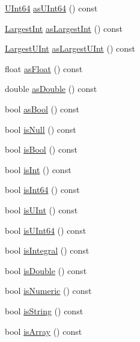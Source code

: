 \begin{DoxyCompactItemize}
\item 
\hyperlink{class_json_1_1_value_a8b62564be8c087c6d18de180ff4e13e3}{U\+Int64} \hyperlink{class_json_1_1_value_aca53fe8b4bdd385010d431e5d01b3987}{as\+U\+Int64} () const
\item 
\hyperlink{class_json_1_1_value_a1cbb82642ed05109b9833e49f042ece7}{Largest\+Int} \hyperlink{class_json_1_1_value_ab16f2ea2a117a1b3b576acab8b6a700d}{as\+Largest\+Int} () const
\item 
\hyperlink{class_json_1_1_value_a6682a3684d635e03fc06ba229fa24eec}{Largest\+U\+Int} \hyperlink{class_json_1_1_value_ad03548101e0bf3d2d9eac75c64a0b8d7}{as\+Largest\+U\+Int} () const
\item 
float \hyperlink{class_json_1_1_value_af3a4d10bf575fabdc5440a7135c9649c}{as\+Float} () const
\item 
double \hyperlink{class_json_1_1_value_afd24002a18aef907ad746b1cb9eda0a2}{as\+Double} () const
\item 
bool \hyperlink{class_json_1_1_value_ab693fb7b9b1595bb0adc49658bbf780d}{as\+Bool} () const
\item 
bool \hyperlink{class_json_1_1_value_abde4070e21e46dc4f8203f66582cb19f}{is\+Null} () const
\item 
bool \hyperlink{class_json_1_1_value_ab1f02651cb89d0f18b63a036959391ba}{is\+Bool} () const
\item 
bool \hyperlink{class_json_1_1_value_aff51d8b52979ca06cf9d909accd5f695}{is\+Int} () const
\item 
bool \hyperlink{class_json_1_1_value_a4a81fb3c3acdbb68b2e2f30836a4f53e}{is\+Int64} () const
\item 
bool \hyperlink{class_json_1_1_value_abdda463d3269015f883587349726cfbc}{is\+U\+Int} () const
\item 
bool \hyperlink{class_json_1_1_value_a883576e35cb03a785258edb56777a2de}{is\+U\+Int64} () const
\item 
bool \hyperlink{class_json_1_1_value_ab6798954f6e80281cf22708ef45198a7}{is\+Integral} () const
\item 
bool \hyperlink{class_json_1_1_value_a4a2e2a790e19a1c09fc5dd12d7ad47b5}{is\+Double} () const
\item 
bool \hyperlink{class_json_1_1_value_af961a000cd203c895e44c195ab39b866}{is\+Numeric} () const
\item 
bool \hyperlink{class_json_1_1_value_a71e1f82cf1c3eaf969d400dcffb163a6}{is\+String} () const
\item 
bool \hyperlink{class_json_1_1_value_a1627eb9d6568d6d0252fa8bb711c0a59}{is\+Array} () const

\end{DoxyCompactItemize}
